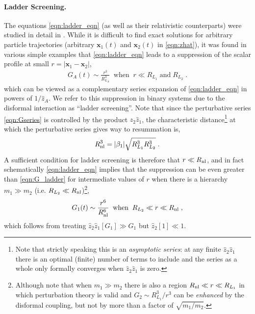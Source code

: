 \documentclass[11pt]{article}
\begin{document}
  
\paragraph{Ladder Screening.}
The equations \eqref{eqn:ladder_eqn} (as well as their relativistic counterparts) were studied in detail in \cite{Davis:2019ltc}. 
While it is difficult to find exact solutions for arbitrary particle trajectories (arbitrary $\mathbf{x}_1(t)$ and $\mathbf{x}_2 (t)$ in \eqref{eqn:zhat}), it was found in various simple examples that \eqref{eqn:ladder_eqn} leads to a suppression of the scalar profile at small $r = | \mathbf{x}_1 - \mathbf{x}_2 |$,
\begin{align}
 G_A ( t )  \sim \frac{  r^3 }{ R_{L_A}^3 } \;\; \text{when} \;\; r \ll R_{L_1} \; \text{and} \;  R_{L_2}  \; .
\label{eqn:G_ladder}
\end{align} 
which can be viewed as a complementary series expansion of \eqref{eqn:ladder_eqn} in powers of $1/\hat{z}_A$. 
We refer to this suppression in binary systems due to the disformal interaction as ``ladder screening''. Note that since the perturbative series \eqref{eqn:Gseries} is controlled by the product $\hat{z}_2 \hat{z}_1$, the characteristic distance\footnote{
Note that strictly speaking this is an \emph{asymptotic series}: at any finite $\hat{z}_2 \hat{z}_1$ there is an optimal (finite) number of terms to include and the series as a whole only formally converges when $\hat{z}_2 \hat{z}_1$ is zero. 
} at which the perturbative series gives way to resummation is,
\begin{align} 
 R_{\rm nl}^3 = | \beta_1 | \sqrt{ R_{L_1}^3 R_{L_2}^3 } \; . 
\end{align}
A sufficient condition for ladder screening is therefore that $r \ll R_{\rm nl}$, and in fact schematically \eqref{eqn:ladder_eqn} implies that the suppression can be even greater than \eqref{eqn:G_ladder} for intermediate values of $r$ when there is a hierarchy $m_1 \gg m_2$ (i.e. $R_{L_2} \ll R_{\rm nl}$)\footnote{
Although note that when $m_1 \gg m_2$ there is also a region $R_{\rm nl} \ll r \ll R_{L_1}$ in which perturbation theory is valid and $G_2 \sim R_{L_1}^3 / r^3$ can be \emph{enhanced} by the disformal coupling, but not by more than a factor of $\sqrt{m_1/m_2}$.  
},
 \begin{align}
 G_1 ( t )  \sim \frac{  r^6 }{ R_{\rm nl}^6 } \;\; \text{when} \;\; R_{L_2} \ll r \ll R_{\rm nl} \; ,
\end{align} 
which follows from treating $\hat{z}_2 \hat{z}_1 [ G_1 ] \gg G_1$ but $\hat{z}_2 [1] \ll 1$. 
\end{document}

